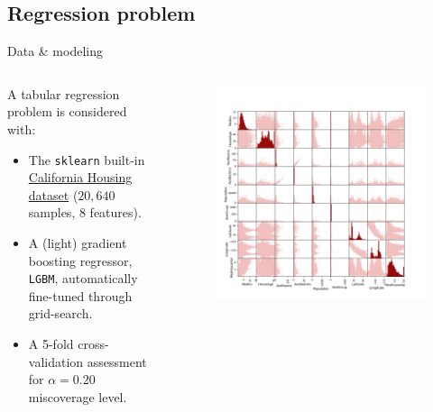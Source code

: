 \documentclass{beamer}
\renewcommand{\a}{\alpha}
\begin{document}

\subsection{Regression problem}


\begin{frame}{Data \& modeling}
\begin{columns} %
        \vspace{-5mm}
        \begin{column}{0.5\textwidth} %
            A tabular regression problem is considered with:
            \begin{itemize}%
                \item The \texttt{sklearn} built-in \href{https://scikit-learn.org/stable/modules/generated/sklearn.datasets.fetch_california_housing.html}{California Housing dataset} ($20,640$ samples, 8 features).
                \item A (light) gradient boosting regressor, \texttt{LGBM}, automatically fine-tuned through grid-search. 
                \item A 5-fold cross-validation assessment for $\a=0.20$ miscoverage level.
            \end{itemize}
        \end{column}
        \begin{column}{0.5\textwidth} %
            \begin{figure}
                \includegraphics[width=\textwidth]{Figures/regression/data-regression-problem.png}

\end{figure}
\end{column}
\end{columns}
\end{frame}
\end{document}
